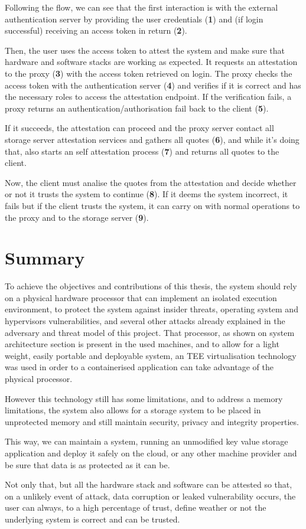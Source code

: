 Following the flow, we can see that the first interaction is with the external authentication server by providing the user credentials (\textbf{1}) and (if login successful) receiving an access token in return (\textbf{2}). 

Then, the user uses the access token to attest the system and make sure that hardware and software stacks are working as expected. It requests an attestation to the proxy (\textbf{3}) with the access token retrieved on login. The proxy checks the access token with the authentication server (\textbf{4}) and verifies if it is correct and has the necessary roles to access the attestation endpoint. If the verification fails, a proxy returns an authentication/authorisation fail back to the client (\textbf{5}). 

If it succeeds, the attestation can proceed and the proxy server contact all storage server attestation services and gathers all quotes (\textbf{6}), and while it's doing that, also starts an self attestation process (\textbf{7}) and returns all quotes to the client. 

Now, the client must analise the quotes from the attestation and decide whether or not it trusts the system to continue (\textbf{8}). If it deems the system incorrect, it fails but if the client trusts the system, it can carry on with normal operations to the proxy and to the storage server (\textbf{9}).

\section{Summary} %
\label{sec:chapter3_summary}

To achieve the objectives and contributions of this thesis, the system should rely on a physical hardware processor that can implement an isolated execution environment, to protect the system against insider threats, operating system and hypervisors vulnerabilities, and several other attacks already explained in the adversary and threat model of this project. That processor, as shown on system architecture section is present in the used machines, and to allow for a light weight, easily portable and deployable system, an TEE virtualisation technology was used in order to a containerised application can take advantage of the physical processor.

However this technology still has some limitations, and to address a memory limitations, the system also allows for a storage system to be placed in unprotected memory and still maintain security, privacy and integrity properties.

This way, we can maintain a system, running an unmodified key value storage application and deploy it safely on the cloud, or any other machine provider and be sure that data is as protected as it can be.

Not only that, but all the hardware stack and software can be attested so that, on a unlikely event of attack, data corruption or leaked vulnerability occurs, the user can always, to a high percentage of trust, define weather or not the underlying system is correct and can be trusted.